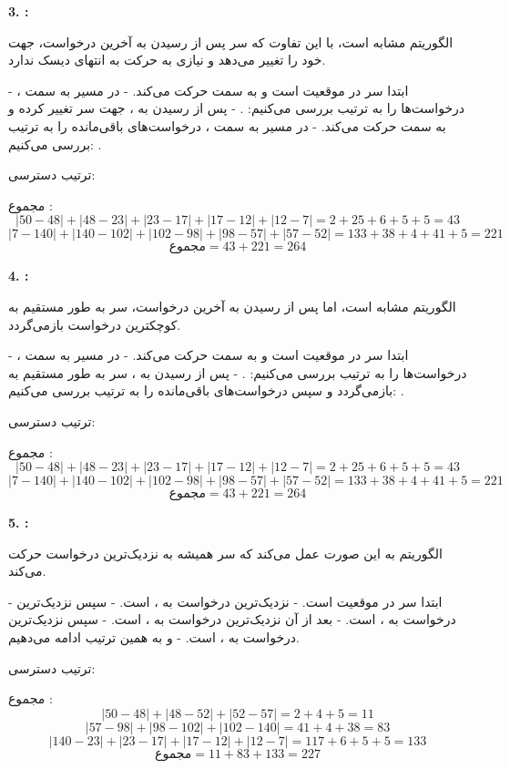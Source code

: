 \begin{qsolve}
	\textbf{3. :}
	
	الگوریتم  مشابه  است، با این تفاوت که سر پس از رسیدن به آخرین درخواست، جهت خود را تغییر می‌دهد و نیازی به حرکت به انتهای دیسک ندارد.
	
	- ابتدا سر در موقعیت  است و به سمت  حرکت می‌کند.
	- در مسیر به سمت ، درخواست‌ها را به ترتیب بررسی می‌کنیم: .
	- پس از رسیدن به ، جهت سر تغییر کرده و به سمت  حرکت می‌کند.
	- در مسیر به سمت ، درخواست‌های باقی‌مانده را به ترتیب بررسی می‌کنیم: .
	
	ترتیب دسترسی: 
	
	مجموع :
	\[
	|50 - 48| + |48 - 23| + |23 - 17| + |17 - 12| + |12 - 7| = 2 + 25 + 6 + 5 + 5 = 43
	\]
	\[
	|7 - 140| + |140 - 102| + |102 - 98| + |98 - 57| + |57 - 52| = 133 + 38 + 4 + 41 + 5 = 221
	\]
	\[
	\text{مجموع} = 43 + 221 = 264
	\]
	
	
	
	
	\textbf{4. :}
	
	الگوریتم  مشابه  است، اما پس از رسیدن به آخرین درخواست، سر به طور مستقیم به کوچکترین درخواست بازمی‌گردد.
	
	- ابتدا سر در موقعیت  است و به سمت  حرکت می‌کند.
	- در مسیر به سمت ، درخواست‌ها را به ترتیب بررسی می‌کنیم: .
	- پس از رسیدن به ، سر به طور مستقیم به  بازمی‌گردد و سپس درخواست‌های باقی‌مانده را به ترتیب بررسی می‌کنیم: .
	
	ترتیب دسترسی: 
	
	مجموع :
	\[
	|50 - 48| + |48 - 23| + |23 - 17| + |17 - 12| + |12 - 7| = 2 + 25 + 6 + 5 + 5 = 43
	\]
	\[
	|7 - 140| + |140 - 102| + |102 - 98| + |98 - 57| + |57 - 52| = 133 + 38 + 4 + 41 + 5 = 221
	\]
	\[
	\text{مجموع} = 43 + 221 = 264
	\]
	
	
	
	\textbf{5. :}
	
	الگوریتم  به این صورت عمل می‌کند که سر همیشه به نزدیک‌ترین درخواست حرکت می‌کند.
	
	- ابتدا سر در موقعیت  است.
	- نزدیک‌ترین درخواست به ،  است.
	- سپس نزدیک‌ترین درخواست به ،  است.
	- بعد از آن نزدیک‌ترین درخواست به ،  است.
	- سپس نزدیک‌ترین درخواست به ،  است.
	- و به همین ترتیب ادامه می‌دهیم.
	
	ترتیب دسترسی: 
	
	مجموع :
	\[
	|50 - 48| + |48 - 52| + |52 - 57| = 2 + 4 + 5 = 11
	\]
	\[
	|57 - 98| + |98 - 102| + |102 - 140| = 41 + 4 + 38 = 83
	\]
	\[
	|140 - 23| + |23 - 17| + |17 - 12| + |12 - 7| = 117 + 6 + 5 + 5 = 133
	\]
	\[
	\text{مجموع} = 11 + 83 + 133 = 227
	\]
	
\end{qsolve}